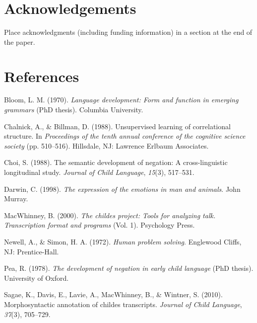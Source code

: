 \documentclass[10pt, letterpaper]{article}
\begin{document}
\hypertarget{acknowledgements}{%
\section{Acknowledgements}\label{acknowledgements}}

Place acknowledgments (including funding information) in a section at
the end of the paper.

\hypertarget{references}{%
\section{References}\label{references}}

\setlength{\parindent}{-0.1in} 
\setlength{\leftskip}{0.125in}

\noindent

\hypertarget{refs}{}
\leavevmode\hypertarget{ref-bloom1970language}{}%
Bloom, L. M. (1970). \emph{Language development: Form and function in
emerging grammars} (PhD thesis). Columbia University.

\leavevmode\hypertarget{ref-ChalnickBillman1988a}{}%
Chalnick, A., \& Billman, D. (1988). Unsupervised learning of
correlational structure. In \emph{Proceedings of the tenth annual
conference of the cognitive science society} (pp. 510--516). Hillsdale,
NJ: Lawrence Erlbaum Associates.

\leavevmode\hypertarget{ref-choi1988semantic}{}%
Choi, S. (1988). The semantic development of negation: A
cross-linguistic longitudinal study. \emph{Journal of Child Language},
\emph{15}(3), 517--531.

\leavevmode\hypertarget{ref-darwin1872expression}{}%
Darwin, C. (1998). \emph{The expression of the emotions in man and
animals}. John Murray.

\leavevmode\hypertarget{ref-macwhinney2000childes}{}%
MacWhinney, B. (2000). \emph{The childes project: Tools for analyzing
talk. Transcription format and programs} (Vol. 1). Psychology Press.

\leavevmode\hypertarget{ref-NewellSimon1972a}{}%
Newell, A., \& Simon, H. A. (1972). \emph{Human problem solving}.
Englewood Cliffs, NJ: Prentice-Hall.

\leavevmode\hypertarget{ref-pea1978}{}%
Pea, R. (1978). \emph{The development of negation in early child
language} (PhD thesis). University of Oxford.

\leavevmode\hypertarget{ref-sagae2010morphosyntactic}{}%
Sagae, K., Davis, E., Lavie, A., MacWhinney, B., \& Wintner, S. (2010).
Morphosyntactic annotation of childes transcripts. \emph{Journal of
Child Language}, \emph{37}(3), 705--729.


\end{document}
